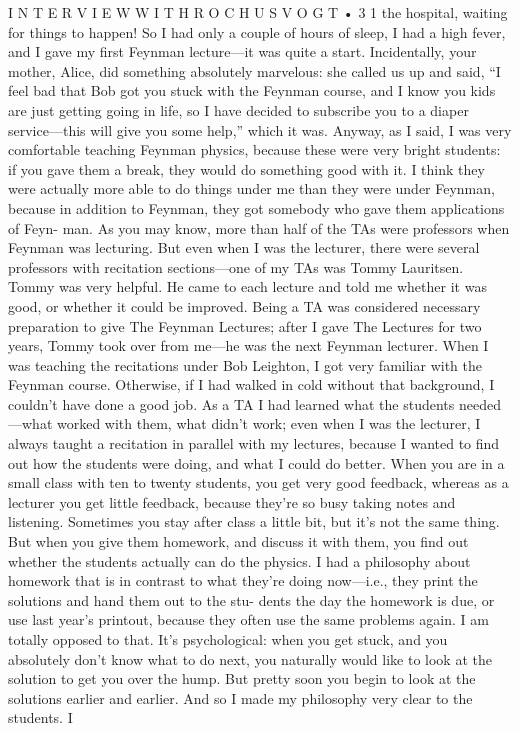 \documentclass[11pt,oneside]{article}
\begin{document}
I N T E R V I E W  W I T H  R O C H U S  V O G T • 3 1 the hospital, waiting for things to happen! So I had only a couple of hours of sleep, I had a high fever, and I gave my first Feynman lecture---it was quite a start. Incidentally, your mother, Alice, did something absolutely marvelous: she called us up and said, “I feel bad that Bob got you stuck with the Feynman course, and I know you kids are just getting going in life, so I have decided to subscribe you to a diaper service---this will give you some help,” which it was. Anyway, as I said, I was very comfortable teaching Feynman physics, because these were very bright students: if you gave them a break, they would do something good with it. I think they were actually more able to do things under me than they were under Feynman, because in addition to Feynman, they got somebody who gave them applications of Feyn- man. As you may know, more than half of the TAs were professors when Feynman was lecturing. But even when I was the lecturer, there were several professors with recitation sections---one of my TAs was Tommy Lauritsen. Tommy was very helpful. He came to each lecture and told me whether it was good, or whether it could be improved. Being a TA was considered necessary preparation to give The Feynman Lectures; after I gave The Lectures for two years, Tommy took over from me---he was the next Feynman lecturer. When I was teaching the recitations under Bob Leighton, I got very familiar with the Feynman course. Otherwise, if I had walked in cold without that background, I couldn’t have done a good job. As a TA I had learned what the students needed---what worked with them, what didn’t work; even when I was the lecturer, I always taught a recitation in parallel with my lectures, because I wanted to find out how the students were doing, and what I could do better. When you are in a small class with ten to twenty students, you get very good feedback, whereas as a lecturer you get little feedback, because they’re so busy taking notes and listening. Sometimes you stay after class a little bit, but it’s not the same thing. But when you give them homework, and discuss it with them, you find out whether the students actually can do the physics. I had a philosophy about homework that is in contrast to what they’re doing now---i.e., they print the solutions and hand them out to the stu- dents the day the homework is due, or use last year’s printout, because they often use the same problems again. I am totally opposed to that. It’s psychological: when you get stuck, and you absolutely don’t know what to do next, you naturally would like to look at the solution to get you over the hump. But pretty soon you begin to look at the solutions earlier and earlier. And so I made my philosophy very clear to the students. I\par
\end{document}
